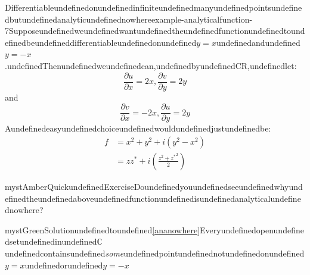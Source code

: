 \begin{mystthmexample}{Differentiableundefinedonundefinedinfiniteundefinedmanyundefinedpointsundefinedbutundefinedanalyticundefinednowhere}{example-analyticalfunction-7}Supposeundefinedweundefinedwantundefinedtheundefinedfunctionundefinedtoundefinedbeundefineddifferentiableundefinedonundefined$y=x$undefinedandundefined$y= -x$.undefinedThenundefinedweundefinedcan,undefinedbyundefinedCR,undefinedlet:
\begin{equation}
\frac{\partial u}{\partial x} =2x, \frac{\partial v}{\partial y} = 2y
\end{equation}
and
\begin{equation}
\frac{\partial v}{\partial x} =-2x, \frac{\partial u}{\partial y} = 2y
\end{equation}
Aundefinedeasyundefinedchoiceundefinedwouldundefinedjustundefinedbe:
\begin{equation}
\begin{aligned}
f&=x^2+y^2 +i(y^2-x^2) \\
&= zz^*+i\left(\frac{z^2+{z^*}^2}{2}\right)
\end{aligned}
\end{equation}

\end{mystthmexample}
\begin{mystadmonition}{mystAmber}{QuickundefinedExercise}\label{ananowhere}Doundefinedyouundefinedseeundefinedwhyundefinedtheundefinedaboveundefinedfunctionundefinedisundefinedanalyticalundefinednowhere?

\end{mystadmonition}
\begin{mystadmonition}{mystGreen}{Solutionundefinedtoundefined\ref{ananowhere}}Everyundefinedopenundefinedsetundefinedinundefined$\mathbb{C}$undefinedcontainsundefined\textit{some}undefinedpointundefinednotundefinedonundefined$y=x$undefinedorundefined$y= -x$

\end{mystadmonition}